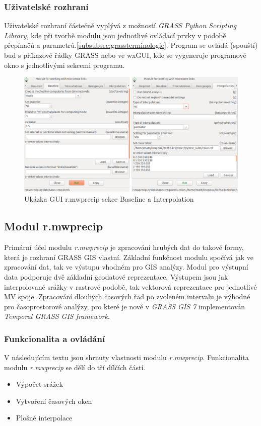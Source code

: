\documentclass[a4paper,12pt,oneside]{report}
\begin{document}
\subsubsection{Uživatelské rozhraní}
Uživatelské rozhraní částečně vyplývá z možností \textit{GRASS Python Scripting Library}, kde při tvorbě modulu jsou jednotlivé ovládací prvky v podobě přepínačů a parametrů.\ref{subsubsec:grassterminologie}. Program se ovládá (spouští) bud s příkazové řádky GRASS nebo ve wxGUI, kde se vygeneruje programové okno s jednotlivými sekcemi programu. 

\begin{figure}[h!]
    \centering
    \includegraphics[width=\textwidth]{./img/grass/gui.png}
    \caption[GUI modul]{Ukázka GUI r.mwprecip sekce Baseline a Interpolation  \centering  }
        \label{fig:baseline}
 \end{figure}

\subsection{Modul r.mwprecip}
Primární účel  modulu \textit{r.mwprecip} je zpracování hrubých dat do takové formy, která je rozhraní GRASS GIS vlastní. Základní funkčnost modulu spočívá jak ve zpracování dat, tak ve výstupu vhodném pro GIS analýzy. Modul pro výstupní data podporuje dvě základní geodatové reprezentace. Výstupem jsou jak interpolované srážky v rastrové podobě, tak vektorová reprezentace pro jednotlivé MV spoje. 
Zpracování dlouhých časových řad po zvoleném intervalu je výhodné pro časoprostorové analýzy, pro které je nově v \textit{GRASS GIS 7} implementován \textit{Temporal GRASS GIS framework}.





 
\subsubsection{Funkcionalita a ovládání}
V následujícím textu jsou shrnuty vlastnosti modulu \textit{r.mwprecip}. Funkcionalita modulu \textit{r.mwprecip} se dělí do tří dílčích částí.
\begin{itemize}
\item Výpočet srážek
\item Vytvoření časových oken
\item Plošné interpolace 
\end{itemize}
\end{document}
